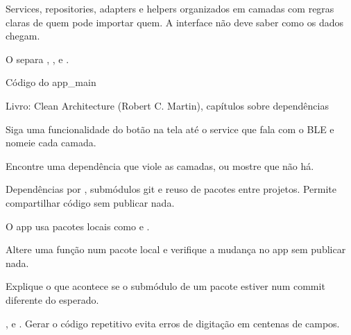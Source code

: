 Services, repositories, adapters e helpers organizados em camadas com regras claras de quem pode importar quem. A interface não deve saber como os dados chegam.

\begin{noproduto}
O  separa , ,  e .
\end{noproduto}

\begin{paraestudar}
  \item Código do app\_main
  \item Livro: Clean Architecture (Robert C. Martin), capítulos sobre dependências
\end{paraestudar}

\begin{pratique}
  \item Siga uma funcionalidade do botão na tela até o service que fala com o BLE e nomeie cada camada.
  \item Encontre uma dependência que viole as camadas, ou mostre que não há.
\end{pratique}

Dependências por , submódulos git e reuso de pacotes entre projetos. Permite compartilhar código sem publicar nada.

\begin{noproduto}
O app usa pacotes locais como  e .
\end{noproduto}

\begin{paraestudar}
  \item {}
\end{paraestudar}

\begin{pratique}
  \item Altere uma função num pacote local e verifique a mudança no app sem publicar nada.
  \item Explique o que acontece se o submódulo de um pacote estiver num commit diferente do esperado.
\end{pratique}

,  e . Gerar o código repetitivo evita erros de digitação em centenas de campos.


